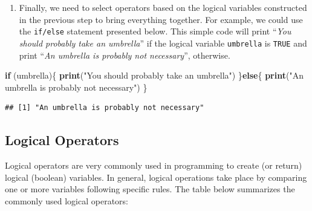 \documentclass[12pt,]{krantz}
\newenvironment{Shaded}{\begin{snugshade}}{\end{snugshade}}
\newcommand{\KeywordTok}[1]{\textcolor[rgb]{0.27,0.27,0.27}{\textbf{#1}}}
\newcommand{\StringTok}[1]{\textcolor[rgb]{0.5,0.5,0.5}{#1}}
\newcommand{\ControlFlowTok}[1]{\textcolor[rgb]{0.27,0.27,0.27}{\textbf{#1}}}
\newcommand{\NormalTok}[1]{#1}
\providecommand{\tightlist}{%
  \setlength{\itemsep}{0pt}\setlength{\parskip}{0pt}}
\begin{document}
\begin{enumerate}
\def\labelenumi{\arabic{enumi})}
\setcounter{enumi}{2}
\tightlist
\item
  Finally, we need to select operators based on the logical variables
  constructed in the previous step to bring everything together. For
  example, we could use the \texttt{if/else} statement presented below.
  This simple code will print ``\emph{You should probably take an
  umbrella}'' if the logical variable \texttt{umbrella} is \texttt{TRUE}
  and print ``\emph{An umbrella is probably not necessary}'', otherwise.
\end{enumerate}

\begin{Shaded}
\begin{Highlighting}[]
\ControlFlowTok{if}\NormalTok{ (umbrella)\{}
  \KeywordTok{print}\NormalTok{(}\StringTok{"You should probably take an umbrella"}\NormalTok{)}
\NormalTok{\}}\ControlFlowTok{else}\NormalTok{\{}
  \KeywordTok{print}\NormalTok{(}\StringTok{"An umbrella is probably not necessary"}\NormalTok{)}
\NormalTok{\}}
\end{Highlighting}
\end{Shaded}

\begin{verbatim}
## [1] "An umbrella is probably not necessary"
\end{verbatim}

\subsection{Logical Operators}\label{sec_logical}

Logical operators are very commonly used in programming to create (or
return) logical (boolean) variables. In general, logical operations take
place by comparing one or more variables following specific rules. The
table below summarizes the commonly used logical operators:
\end{document}
